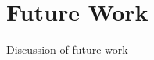 \documentclass[main.tex]{subfiles}
\begin{document}
\section*{Future Work}
Discussion of future work
\end{document}
